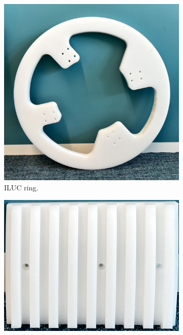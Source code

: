 \begin{figure}[H]
    \begin{subfigure}{0.45\textwidth}
        \centering
        \includegraphics[width=\textwidth]{images/ILUC_ring.jpeg}
        \caption{ILUC ring.}
    \end{subfigure}
    \begin{subfigure}{0.45\textwidth}
        \centering
        \includegraphics[width=\textwidth]{images/ILUC_ribs_mockup.jpeg}

\end{subfigure}
\end{figure}
